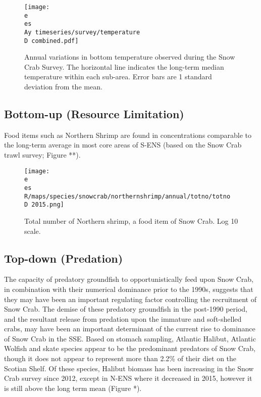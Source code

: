 \documentclass[paper=a4, fontsize=11pt]{article}
\newcommand{\D}{.}
\newcommand{\e}{\string~/ecomod_data/}   %
\newcommand{\es}{snowcrab/}
\newcommand{\Ay}{assessments/2015/}
\begin{document}
\begin{figure}[h]
    \centering
    \texttt{[image: \\e \\es \\Ay timeseries/survey/temperature\\D combined.pdf]}
    \caption{Annual variations in bottom temperature observed during the Snow Crab Survey. The horizontal line indicates the long-term median temperature within each sub-area. Error bars are 1 standard deviation from the mean.}
\end{figure}


\subsection{Bottom-up (Resource Limitation)}

Food items such as Northern Shrimp are found in concentrations comparable to the long-term average in most core areas of S-ENS (based on the Snow Crab trawl survey; Figure **).

\begin{figure}[h]
  \centering
     \texttt{[image: \\e \\es R/maps/species/snowcrab/northernshrimp/annual/totno/totno\\D 2015.png]}
    \caption{Total number of Northern shrimp, a food item of Snow Crab. Log 10 scale.}
\end{figure}

\subsection{Top-down (Predation)}
The capacity of predatory groundfish to opportunistically feed upon Snow Crab, in combination with their numerical dominance prior to the 1990s, suggests that they may have been an important regulating factor controlling the recruitment of Snow Crab. The demise of these predatory groundfish in the post-1990 period, and the resultant release from predation upon the immature and soft-shelled crabs, may have been an important determinant of the current rise to dominance of Snow Crab in the SSE. Based on stomach sampling, Atlantic Halibut, Atlantic Wolfish and skate species appear to be the predominant predators of Snow Crab, though it does not appear to represent more than 2.2\% of their diet on the Scotian Shelf. Of these species, Halibut biomass has been increasing in the Snow Crab survey since 2012, except in N-ENS where it decreased in 2015, however it is still above the long term mean (Figure *). 
\end{document}
